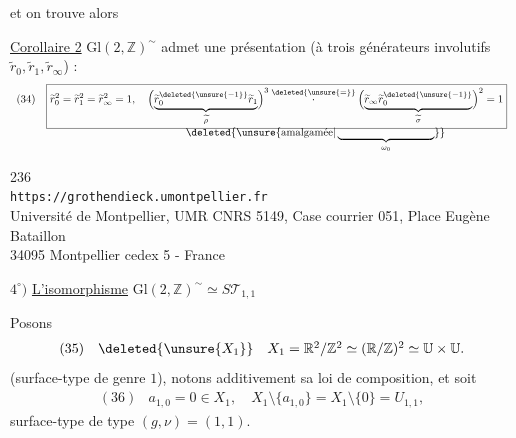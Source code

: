et on trouve alors

\uline{Corollaire 2} $\mathrm{Gl}(2,\mathbb Z)^{\sim}$ admet une présentation (à trois générateurs involutifs $\widetilde r_0,\widetilde r_1,\widetilde r_\infty$) :
\[
\begin{array}{ll}
(34)&\boxed{\widetilde r_0^2=\widetilde r_1^2=\widetilde r_\infty^2=1,\quad
\Bigl(\underbrace{\widetilde r_0^{\deleted{\unsure{-1}}}\widetilde r_1}_{\widetilde\rho}\Bigr)^3
\overset{\deleted{\unsure{=}}}{\cdot}
\Bigl(\underbrace{\widetilde r_\infty\widetilde r_0^{\deleted{\unsure{-1}}}}_{\widetilde\sigma}\Bigr)^2=1}\\[-2pt]
&\hspace{13em}\deleted{\unsure{\text{amalgamée}|\underbrace{\hspace{9em}}_{\omega_0}}}
\end{array}
\]


\begin{center}
236\\
\texttt{https://grothendieck.umontpellier.fr}\\
Université de Montpellier, UMR CNRS 5149, Case courrier 051, Place Eugène Bataillon\\
34095 Montpellier cedex 5 - France
\end{center}

$4^\circ)$ \uline{L'isomorphisme} $\mathrm{Gl}(2,\mathbb Z)^{\sim}\simeq S\mathcal T_{1,1}$

\margin{$\unsure{\checkmark}$}
Posons
\[
\begin{array}{ll}
(35)&\deleted{\unsure{X_1}}\quad X_1=\mathbb R^2/\mathbb Z^2\simeq(\mathbb R/\mathbb Z)^2\simeq\mathbb U\times\mathbb U.
\end{array}
\]
(surface-type de genre $1$), notons additivement sa loi de composition, et soit
\[
\begin{array}{ll}
(36)&a_{1,0}=0\in X_1,\quad X_1\setminus\{a_{1,0}\}=X_1\setminus\{0\}=U_{1,1},
\end{array}
\]
surface-type de type $(g,\nu)=(1,1)$.

